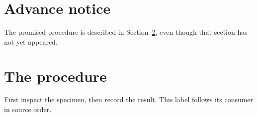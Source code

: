 \documentclass{article}
\begin{document}
\section{Advance notice}
The promised procedure is described in Section~\ref{sec:procedure}, even though that section has not yet appeared.

\section{The procedure}\label{sec:procedure}
First inspect the specimen, then record the result. This label follows its consumer in source order.
\end{document}
